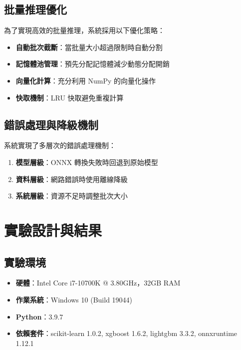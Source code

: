 \documentclass[11pt,a4paper]{article}
\begin{document}
\subsection{批量推理優化}

為了實現高效的批量推理，系統採用以下優化策略：

\begin{itemize}
    \item \textbf{自動批次截斷}：當批量大小超過限制時自動分割
    \item \textbf{記憶體池管理}：預先分配記憶體減少動態分配開銷
    \item \textbf{向量化計算}：充分利用 NumPy 的向量化操作
    \item \textbf{快取機制}：LRU 快取避免重複計算
\end{itemize}

\subsection{錯誤處理與降級機制}

系統實現了多層次的錯誤處理機制：

\begin{enumerate}
    \item \textbf{模型層級}：ONNX 轉換失敗時回退到原始模型
    \item \textbf{資料層級}：網路錯誤時使用離線降級
    \item \textbf{系統層級}：資源不足時調整批次大小
\end{enumerate}

\section{實驗設計與結果}

\subsection{實驗環境}

\begin{itemize}
    \item \textbf{硬體}：Intel Core i7-10700K @ 3.80GHz，32GB RAM
    \item \textbf{作業系統}：Windows 10 (Build 19044)
    \item \textbf{Python}：3.9.7
    \item \textbf{依賴套件}：scikit-learn 1.0.2, xgboost 1.6.2, lightgbm 3.3.2, onnxruntime 1.12.1
\end{itemize}
\end{document}
